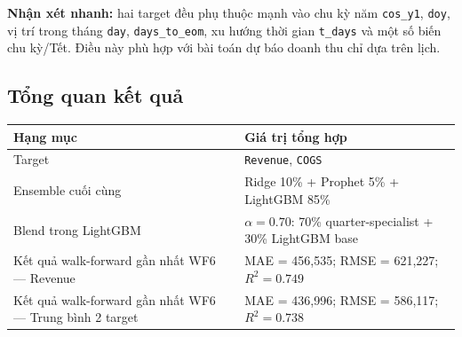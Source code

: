 \documentclass{article}
\begin{document}
\textbf{Nhận xét nhanh:} hai target đều phụ thuộc mạnh vào chu kỳ năm \texttt{cos\_y1}, \texttt{doy}, vị trí trong tháng \texttt{day}, \texttt{days\_to\_eom}, xu hướng thời gian \texttt{t\_days} và một số biến chu kỳ/Tết. Điều này phù hợp với bài toán dự báo doanh thu chỉ dựa trên lịch.

\subsection{Tổng quan kết quả}

\begin{tabularx}{\linewidth}{@{}>{\RaggedRight\arraybackslash}p{3.9cm}X@{}}
\toprule
\textbf{Hạng mục} & \textbf{Giá trị tổng hợp} \\
\midrule
Target & \texttt{Revenue}, \texttt{COGS} \\
Ensemble cuối cùng & Ridge 10\% + Prophet 5\% + LightGBM 85\% \\
Blend trong LightGBM & \(\alpha = 0.70\): 70\% quarter-specialist + 30\% LightGBM base \\
Kết quả walk-forward gần nhất WF6 --- Revenue & MAE = 456,535; RMSE = 621,227; \(R^2 = 0.749\) \\
Kết quả walk-forward gần nhất WF6 --- Trung bình 2 target & MAE = 436,996; RMSE = 586,117; \(R^2 = 0.738\) \\
\bottomrule
\end{tabularx}
\end{document}
